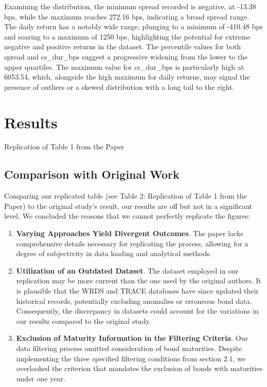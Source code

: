 \documentclass[12pt]{article}
\newcommand*{\PathToOutput}{../output}%
\begin{document}
Examining the distribution, the minimum spread recorded is negative, at -13.38 bps, while the maximum reaches 272.16 bps, indicating a broad spread range. The daily return has a notably wide range, plunging to a minimum of -410.48 bps and soaring to a maximum of 1250 bps, highlighting the potential for extreme negative and positive returns in the dataset. The percentile values for both spread and cs\_dur\_bps suggest a progressive widening from the lower to the upper quartiles. The maximum value for cs\_dur\_bps is particularly high at 6053.54, which, alongside the high maximum for daily returns, may signal the presence of outliers or a skewed distribution with a long tail to the right.



\section{Results}
\begin{table}[ht]
\centering

\caption{Replication of Table 1 from the Paper}
\label{tab:derived_table}
\end{table}

\subsection{Comparison with Original Work}
Comparing our replicated table (see Table 2: Replication of Table 1 from the Paper) to the original study's result, our results are off but not in a significant level. We concluded the reasons that we cannot perfectly replicate the figures:

\begin{enumerate}
    \item \textbf{Varying Approaches Yield Divergent Outcomes}. The paper lacks comprehensive details necessary for replicating the process, allowing for a degree of subjectivity in data loading and analytical methods.
    \item \textbf{Utilization of an Outdated Dataset}. The dataset employed in our replication may be more current than the one used by the original authors. It is plausible that the WRDS and TRACE databases have since updated their historical records, potentially excluding anomalies or erroneous bond data. Consequently, the discrepancy in datasets could account for the variations in our results compared to the original study.
    \item \textbf{Exclusion of Maturity Information in the Filtering Criteria}. Our data filtering process omitted consideration of bond maturities. Despite implementing the three specified filtering conditions from section 2.1, we overlooked the criterion that mandates the exclusion of bonds with maturities under one year.
\end{enumerate}
\end{document}
